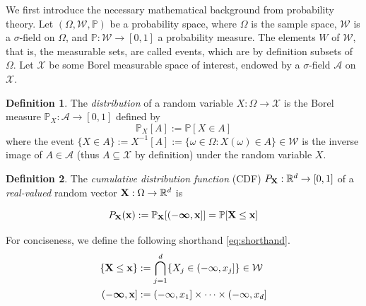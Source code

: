 \documentclass[twoside]{article} \usepackage{aistats2017}
\theoremstyle{definition}
\newtheorem{definition}{Definition}[section]
\theoremstyle{theorem}
\newcommand{\rv}[1]{{#1}}
\begin{document}
%
%
	We first introduce the necessary mathematical background from probability theory. Let $(\Omega, \mathcal{W}, \mathbb{P})$ be a probability space, where $\Omega$ is the sample space, $\mathcal{W}$ is a $\sigma$-field on $\Omega$, and $\mathbb{P} : \mathcal{W} \to [0, 1]$ a probability measure. The elements $W$ of $\mathcal{W}$, that is, the measurable sets, are called events, which are by definition subsets of $\Omega$. Let $\mathcal{X}$ be some Borel measurable space of interest, endowed by a $\sigma$-field $\mathcal{A}$ on $\mathcal{X}$.
%
%
	
	\begin{definition} \label{def:distribution}
		\citep{bauer1981probability}
		The \textit{distribution} of a random variable $\rv{X} : \Omega \to \mathcal{X}$ is the Borel measure $\mathbb{P}_{\rv{X}} : \mathcal{A} \to [0, 1]$ defined by
		\begin{equation}
			\mathbb{P}_{\rv{X}}[A] := \mathbb{P}[\rv{X} \in A]
		\label{eq:distribution}
		\end{equation}
		where the event $\{\rv{X} \in A\} := \rv{X}^{-1}[A] := \{\omega \in \Omega : \rv{X}(\omega) \in A\} \in \mathcal{W}$ is the inverse image of $A \in \mathcal{A}$ (thus $A \subseteq \mathcal{X}$ by definition) under the random variable $\rv{X}$.
	\end{definition}
	
	\begin{definition} \label{def:cdf}
		\citep{bauer1981probability}
		The \textit{cumulative distribution function} (CDF) $P_{\bvec{\rv{X}}} : \mathbb{R}^{d} \to [0, 1]$ of a \textit{real-valued} random vector $\bvec{\rv{X}} : \Omega \to \mathbb{R}^{d}$ is
		
		\begin{equation}
				P_{\bvec{\rv{X}}}(\bvec{x}) := \mathbb{P}_{\bvec{\rv{X}}}[(-\bm{\infty}, \bvec{x}]] = \mathbb{P}[\bvec{\rv{X}} \leq \bvec{x}]
		\label{eq:cdf}
		\end{equation}

		For conciseness, we define the following shorthand \eqref{eq:shorthand}. 
		\begin{equation}
			\begin{aligned}
				\{\bvec{\rv{X}} \leq \bvec{x}\} &:= \bigcap\limits_{j = 1}^{d} \{\rv{X}_{j} \in (-\infty, x_{j}]\} \in \mathcal{W} \\
				(-\bm{\infty}, \bvec{x}] &:= (-\infty, x_{1}] \times \dots \times (-\infty, x_{d}] \\
			\end{aligned}
		\label{eq:shorthand}
		\end{equation}
	\end{definition}
		
\end{document}
